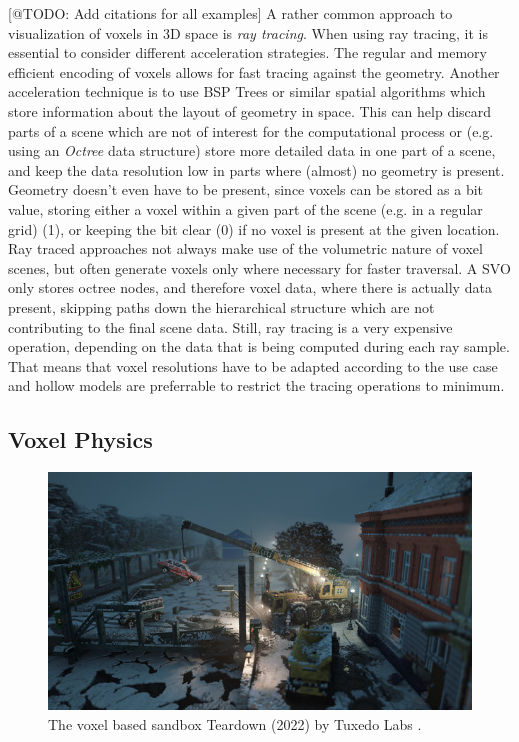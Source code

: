 [@TODO: Add citations for all examples]
A rather common approach to visualization of voxels in 3D space is \emph{ray tracing}. When using 
ray tracing, it is essential to consider different acceleration strategies. The regular and memory 
efficient encoding of voxels allows for fast tracing against the geometry. Another acceleration 
technique is to use \ac{BSP} Trees or similar spatial algorithms which store information about the 
layout of geometry in space. This can help discard parts of a scene which are not of interest for 
the computational process or (e.g. using an \emph{Octree} data structure) store more detailed data in 
one part of a scene, and keep the data resolution low in parts where (almost) no geometry is present. 
Geometry doesn't even have to be present, since voxels can be stored as a bit value, storing either a 
voxel within a given part of the scene (e.g. in a regular grid) (1), or keeping the bit clear (0) if 
no voxel is present at the given location. Ray traced approaches not always make use of the volumetric 
nature of voxel scenes, but often generate voxels only where necessary for faster traversal. A \ac{SVO} 
only stores octree nodes, and therefore voxel data, where there is actually data present, skipping paths 
down the hierarchical structure which are not contributing to the final scene data. Still, ray tracing 
is a very expensive operation, depending on the data that is being computed during each ray sample. 
That means that voxel resolutions have to be adapted according to the use case and hollow models are 
preferrable to restrict the tracing operations to minimum.


\subsection*{Voxel Physics} \label{subsec-voxel-physics}

\begin{figure}[h]
    \centering
    \includegraphics[width=\linewidth]{images/graphics/teardown.jpg}
    \caption{The voxel based sandbox Teardown (2022) by Tuxedo Labs \cite{TuxedoLabs2022}.}
    \label{fig:teardown}
\end{figure}

